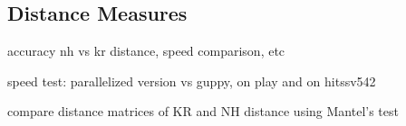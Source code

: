 
\subsection{Distance Measures}
\label{sec:Evaluation:sub:DistanceMeasures}

accuracy nh vs kr distance, speed comparison, etc

speed test: parallelized version vs guppy, on play and on hitssv542

compare distance matrices of KR and NH distance using Mantel's test \cite{Mantel1967,Legendre1998}


%



